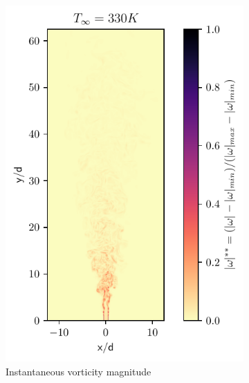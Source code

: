 \begin{figure}[htbp!]
\begin{subfigure}{0.25\textwidth}
	\centering
	\includegraphics[scale=.65]{figures/Plots/vertical/330/magvort_scaled_vert_330.pdf}
	\caption{Instantaneous vorticity magnitude} \label{330_magvort_1}
\end{subfigure}
\hfill
\begin{subfigure}{0.25\textwidth}
	\centering

\end{subfigure}
\end{figure}
